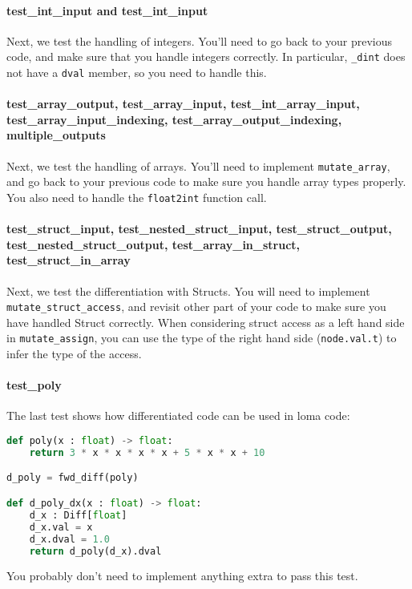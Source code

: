 \paragraph{test_int_input and test_int_input} Next, we test the handling of integers. You'll need to go back to your previous code, and make sure that you handle integers correctly. In particular, \lstinline{_dint} does not have a \lstinline{dval} member, so you need to handle this.

\paragraph{test_array_output, test_array_input, test_int_array_input, test_array_input_indexing, test_array_output_indexing, multiple_outputs} Next, we test the handling of arrays. You'll need to implement \lstinline{mutate_array}, and go back to your previous code to make sure you handle array types properly. You also need to handle the \lstinline{float2int} function call.

\paragraph{test_struct_input, test_nested_struct_input, test_struct_output, test_nested_struct_output, test_array_in_struct, test_struct_in_array} Next, we test the differentiation with Structs. You will need to implement \lstinline{mutate_struct_access}, and revisit other part of your code to make sure you have handled Struct correctly. When considering struct access as a left hand side in \lstinline{mutate_assign}, you can use the type of the right hand side (\lstinline{node.val.t}) to infer the type of the access.

\paragraph{test_poly} The last test shows how differentiated code can be used in loma code:
\begin{lstlisting}[language=Python]
def poly(x : float) -> float:
    return 3 * x * x * x * x + 5 * x * x + 10

d_poly = fwd_diff(poly)

def d_poly_dx(x : float) -> float:
    d_x : Diff[float]
    d_x.val = x
    d_x.dval = 1.0
    return d_poly(d_x).dval
\end{lstlisting}
You probably don't need to implement anything extra to pass this test.



